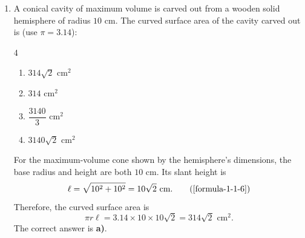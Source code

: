 \vspace{1.2em}
\begin{enumerate}[label={},leftmargin=1.15cm,labelwidth=1.0cm,labelsep=0.15cm,itemindent=0pt,listparindent=0pt,parsep=0pt,topsep=0pt]
\item[5.1.7] A conical cavity of maximum volume is carved out from a wooden solid hemisphere of radius $10$ cm. The curved surface area of the cavity carved out is (use $\pi=3.14$):

\begin{multicols}{4}
\begin{enumerate}
\setlength{\itemsep}{0pt}
    \item $314\sqrt{2}\text{ cm}^2$
    \item $314\text{ cm}^2$
    \item $\dfrac{3140}{3}\text{ cm}^2$
    \item $3140\sqrt{2}\text{ cm}^2$
\end{enumerate}
\end{multicols}

\vspace{0.7em}\par\solution


For the maximum-volume cone shown by the hemisphere's dimensions, the base radius and height are both $10$ cm. Its slant height is
\begin{equation*}
\ell=\sqrt{10^2+10^2}=10\sqrt{2}\text{ cm}.
\tag*{(\ref{formula-1-1-6})}\end{equation*}
Therefore, the curved surface area is
\[
\pi r\ell=3.14\times 10\times 10\sqrt{2}=314\sqrt{2}\text{ cm}^2.
\]
The correct answer is \textbf{a)}.

\end{enumerate}
\vspace{1.2em}
